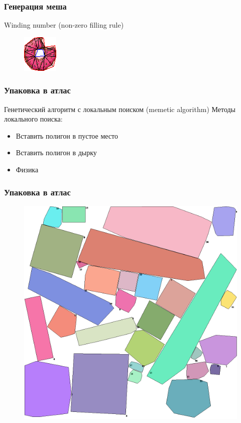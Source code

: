\documentclass[10pt, unicode]{beamer}
\begin{document}
    \begin{frame}
        \frametitle{Генерация меша}
        Winding number (non-zero filling rule)
        \begin{figure}[H]
            \centering
            \includegraphics[scale=1.5]{donutpixel_mesh.png}
        \end{figure}
    \end{frame}
    \begin{frame}
        \frametitle{Упаковка в атлас}
        Генетический алгоритм с локальным поиском (memetic algorithm)
        Методы локального поиска:
        \begin{itemize}
            \item Вставить полигон в пустое место
            \item Вставить полигон в дырку
            \item Физика
        \end{itemize}
    \end{frame}
    \begin{frame}
        \frametitle{Упаковка в атлас}
        \begin{figure}
            \centering
            \includegraphics[width=\linewidth, height=.9\textheight, keepaspectratio]{PackExample.png}
        \end{figure}
    \end{frame}
\end{document}
